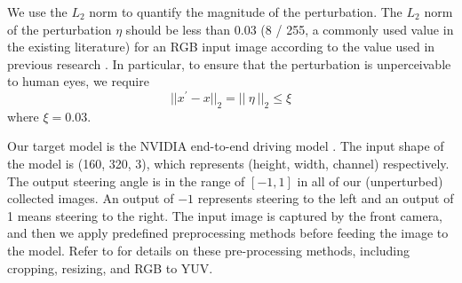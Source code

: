 We use the $L_2$ norm to quantify the magnitude of the perturbation. The $L_2$ norm of the perturbation $\eta$ should be less than 0.03 (8 / 255, a commonly used value in the existing literature) for an RGB input image according to the value used in previous research \citep{chow2020adversarial, andriushchenko2020square}. In particular, to ensure that the perturbation is unperceivable to human eyes, we require \begin{equation}
||x^{'}-x||_{2} = ||\ {\eta}\ ||_{2} \leq \xi %
\end{equation}
where $\xi = 0.03$.

Our target model is the NVIDIA end-to-end driving model \citep{bojarski2016end}. The input shape of the model is (160, 320, 3), which represents (height, width, channel) respectively. The output steering angle is in the range of $[-1, 1]$ in all of our (unperturbed) collected images. An output of $-1$ represents steering to the left and an output of 1 means steering to the right. The input image is captured by the front camera, and then we apply predefined preprocessing methods before feeding the image to the model. Refer to \citep{bojarski2016end} for details on these pre-processing methods, including cropping, resizing, and RGB to YUV. 



